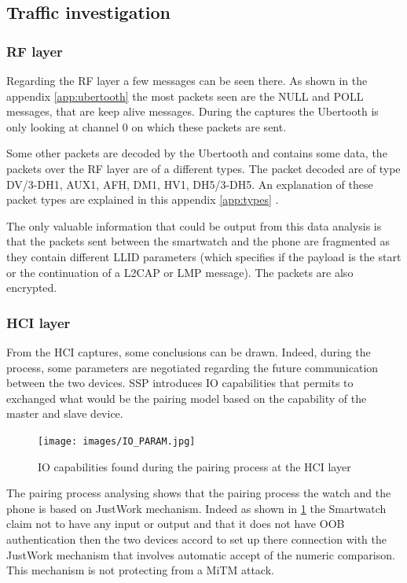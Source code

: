 \subsection{Traffic investigation}
\subsubsection{RF layer}
Regarding the RF layer a few messages can be seen there. As shown in the appendix \ref{app:ubertooth} the most packets seen are the NULL and POLL messages, that are keep alive messages. During the captures the Ubertooth is only looking at channel 0 on which these packets are sent.

Some other packets are decoded by the Ubertooth and contains some data, the packets over the RF layer are of a different types. The packet decoded are of type DV/3-DH1, AUX1, AFH, DM1, HV1, DH5/3-DH5. An explanation of these packet types are explained in this appendix \ref{app:types} .

The only valuable information that could be output from this data analysis is that the packets sent between the smartwatch and the phone are fragmented as they contain different LLID parameters (which specifies if the payload is the start or the continuation of a L2CAP or LMP message). The packets are also encrypted.

\subsubsection{HCI layer}
From the HCI captures, some conclusions can be drawn. Indeed, during the process, some parameters are negotiated regarding the future communication between the two devices. SSP introduces IO capabilities that permits to exchanged what would be the pairing model based on the capability of the master and slave device. 
\begin{figure}[!h]
  \begin{center}
	\texttt{[image: images/IO\_PARAM.jpg]}
	\label{fig:io}
	\caption{IO capabilities found during the pairing process at the HCI layer}
  \end{center}
\end{figure}
The pairing process analysing shows that the pairing process the watch and the phone is based on JustWork mechanism. Indeed as shown in \ref{fig:io} the Smartwatch claim not to have any input or output and that it does not have OOB authentication then the two devices accord to set up there connection with the JustWork mechanism that involves automatic accept of the numeric comparison. This mechanism is not protecting from a MiTM attack.

